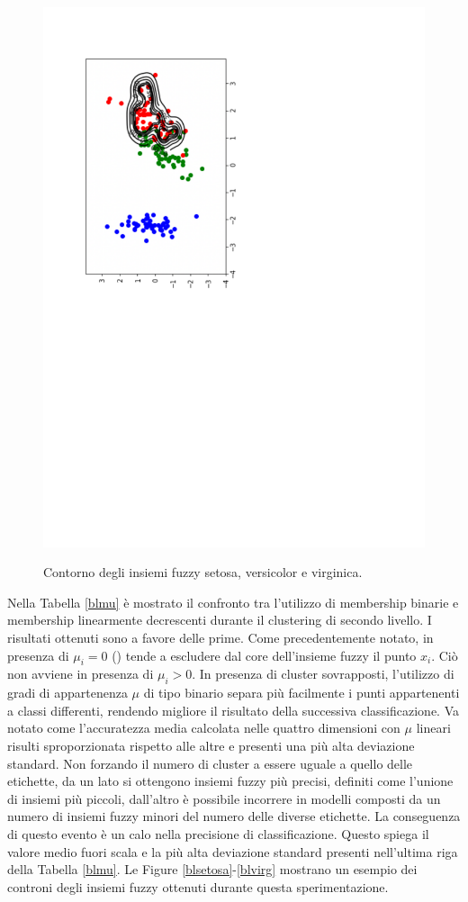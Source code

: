\documentclass [11pt,a4paper,twoside,openright] {book}
\begin{document}
\begin{figure}[!tb]
          {\includegraphics[scale=.35]{figure/wirnvirginica.pdf}}
          \caption{Contorno degli insiemi fuzzy setosa, versicolor e virginica\label{fwirn}.}
\end{figure}
Nella Tabella \ref{blmu} è mostrato il confronto tra l'utilizzo di membership binarie e membership linearmente decrescenti durante il clustering di secondo livello. I risultati ottenuti sono a favore delle prime. Come precedentemente notato, in presenza di $\mu_i = 0$ () tende a escludere dal core dell'insieme fuzzy il punto $x_i$. Ciò non avviene in presenza di $\mu_i > 0$. In presenza di cluster sovrapposti, l'utilizzo di gradi di appartenenza $\mu$ di tipo binario separa più facilmente i punti appartenenti a classi differenti, rendendo migliore il risultato della successiva classificazione. Va notato come l'accuratezza media calcolata nelle quattro dimensioni con $\mu$ lineari risulti sproporzionata rispetto alle altre e presenti una più alta deviazione standard. Non forzando il numero di cluster a essere uguale a quello delle etichette, da un lato si ottengono insiemi fuzzy più precisi, definiti come l'unione di insiemi più piccoli, dall'altro è possibile incorrere in modelli composti da un numero di  insiemi fuzzy minori del numero delle diverse etichette. La conseguenza di questo evento è un calo nella precisione di classificazione. Questo spiega il valore medio fuori scala e la più alta deviazione standard presenti nell'ultima riga della Tabella \ref{blmu}. Le Figure \ref{blsetosa}-\ref{blvirg} mostrano un esempio dei controni degli insiemi fuzzy ottenuti durante questa sperimentazione.
\end{document}
